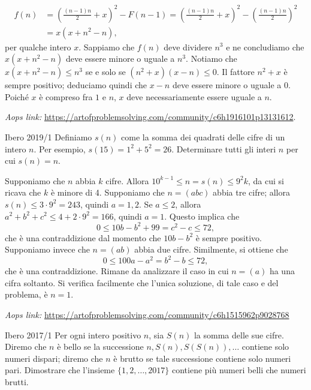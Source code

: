 \documentclass{article}
\begin{document}
\begin{align*}
	f(n) &=\left( \frac{(n-1)n}{2}+x \right) ^2-F(n-1)
	=\left( \frac{(n-1)n}{2}+x \right)^2 - \left( \frac{(n-1)n}{2} \right)^2 \\
		  &= x(x+n^2-n),
\end{align*}
per qualche intero $x$. Sappiamo che $f(n)$ deve dividere $n^3$ e ne concludiamo
che $x(x+n^2-n)$ deve essere minore o uguale a $n^3$. Notiamo che
$x(x+n^2-n)\le n^3$ se e solo se $(n^2+x)(x-n)\le 0$. Il fattore $n^2+x$ è
sempre positivo; deduciamo quindi che $x-n$ deve essere minore o uguale a 0.
Poiché $x$ è compreso fra $1$ e $n$, $x$ deve necessariamente essere uguale a $n$.


\vspace{0.5cm}
\textit{Aops link:}
\href{https://artofproblemsolving.com/community/c6h1916101p13131612}
{https://artofproblemsolving.com/community/c6h1916101p13131612}.

\begin{proposition}{Ibero 2019/1}{}
	Definiamo $s(n)$ come la somma dei quadrati delle cifre di un intero $n$.
	Per esempio, $s(15)=1^2+5^2=26$. Determinare tutti gli interi $n$ per cui
	$s(n)=n$.
\end{proposition}

Supponiamo che $n$ abbia $k$ cifre. Allora $10^{k-1}\le n=s(n) \le 9^2k$,
da cui si ricava che $k$ è minore di 4.
Supponiamo che $n=(abc)$ abbia tre cifre;
allora $s(n)\le 3\cdot 9^2=243$, quindi $a=1,2$. Se $a\le 2$, allora
$a^2+b^2+c^2\le 4+2\cdot 9^2=166$, quindi $a=1$. Questo implica che
\begin{equation*}
	0\le 10b-b^2+99=c^2-c \le 72,
\end{equation*}
che è una contraddizione dal momento che $10b-b^2$ è sempre positivo.
Supponiamo invece che $n=(ab)$ abbia due cifre. Similmente, si ottiene che
\begin{equation*}
	0\le 100a-a^2=b^2-b \le 72,
\end{equation*}
che è una contraddizione. Rimane da analizzare il caso in cui $n=(a)$ ha
una cifra soltanto. Si verifica facilmente che l'unica soluzione, di tale caso
e del problema, è $n=1$.

\vspace{0.5cm}
\textit{Aops link:}
\href{https://artofproblemsolving.com/community/c6h1515962p9028768}
{https://artofproblemsolving.com/community/c6h1515962p9028768}

\begin{proposition}{Ibero 2017/1}{}
	Per ogni intero positivo $n$, sia $S(n)$ la somma delle sue cifre.
	Diremo che $n$ è bello
	se la successione $n, S(n), S(S(n)),\dots$ contiene solo
	numeri dispari; diremo che $n$ è brutto se tale successione
	contiene solo numeri pari. Dimostrare che l'insieme
	$\{1,2,\dots,2017 \}$ contiene più numeri belli che numeri brutti.
\end{proposition}
\end{document}
